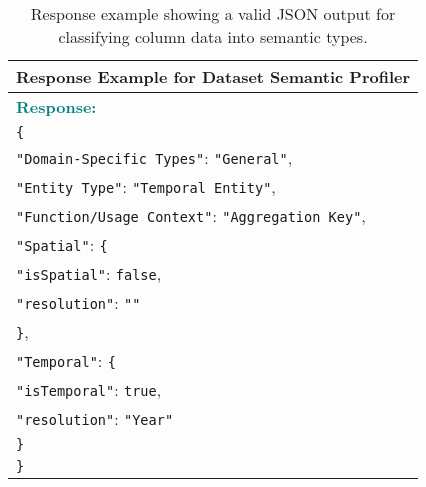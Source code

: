 \begin{table*}
    \small
    \centering
    \begin{tabular}{p{14cm}}
    \toprule
    \textbf{Response Example for Dataset Semantic Profiler} \\
    \midrule
    \textcolor{teal}{\textbf{Response:}} \\
    \texttt{\{} \\
    \quad \texttt{"Domain-Specific Types"}: \texttt{"General"}, \\
    \quad \texttt{"Entity Type"}: \texttt{"Temporal Entity"}, \\
    \quad \texttt{"Function/Usage Context"}: \texttt{"Aggregation Key"}, \\
    \quad \texttt{"Spatial"}: \texttt{\{} \\
    \qquad \texttt{"isSpatial"}: \texttt{false}, \\
    \qquad \texttt{"resolution"}: \texttt{""} \\
    \quad \texttt{\}}, \\
    \quad \texttt{"Temporal"}: \texttt{\{} \\
    \qquad \texttt{"isTemporal"}: \texttt{true}, \\
    \qquad \texttt{"resolution"}: \texttt{"Year"} \\
    \quad \texttt{\}} \\
    \texttt{\}} \\
    \bottomrule
    \end{tabular}
    \caption{Response example showing a valid JSON output for classifying column data into semantic types.}
    \label{tab:sp_prompt_response_example}
\end{table*}
